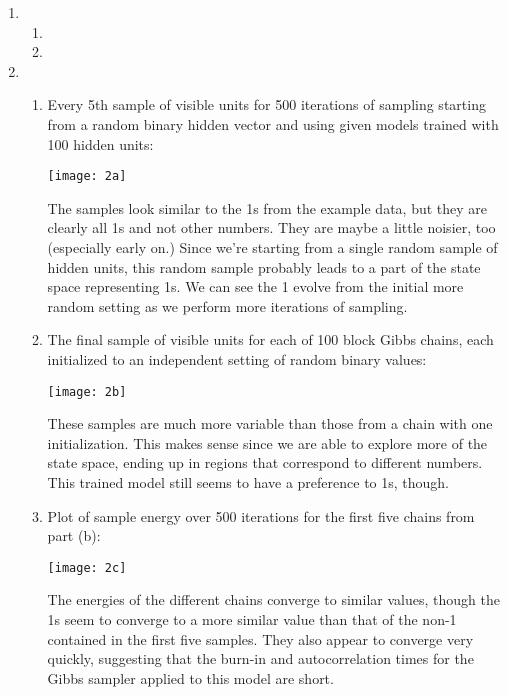 \documentclass[12pt]{article}
\begin{document}
\begin{enumerate}

\item %
\begin{enumerate}
\item
\item
\end{enumerate}

\item %
\begin{enumerate}
\item
Every 5th sample of visible units for 500 iterations of sampling starting from a random binary hidden vector and using given models trained with 100 hidden units:
\begin{center}
\texttt{[image: 2a]}
\end{center}
The samples look similar to the 1s from the example data, but they are clearly all 1s and not other numbers. They are maybe a little noisier, too (especially early on.) Since we're starting from a single random sample of hidden units, this random sample probably leads to a part of the state space representing 1s. We can see the 1 evolve from the initial more random setting as we perform more iterations of sampling.

\item
The final sample of visible units for each of 100 block Gibbs chains, each initialized to an independent setting of random binary values: 
\begin{center}
\texttt{[image: 2b]}
\end{center}
These samples are much more variable than those from a chain with one initialization. This makes sense since we are able to explore more of the state space, ending up in regions that correspond to different numbers. This trained model still seems to have a preference to 1s, though.

\item
Plot of sample energy over 500 iterations for the first five chains from part (b):
\begin{center}
\texttt{[image: 2c]}
\end{center}
The energies of the different chains converge to similar values, though the 1s seem to converge to a more similar value than that of the non-1 contained in the first five samples. They also appear to converge very quickly, suggesting that the burn-in and autocorrelation times for the Gibbs sampler applied to this model are short.


\end{enumerate}
\end{enumerate}
\end{document}
